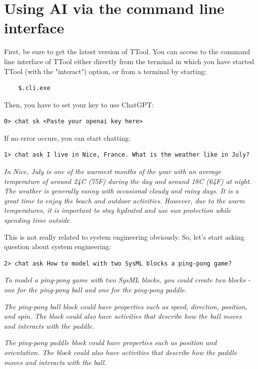 \documentclass[12pt]{article}
\begin{document}
\newpage
\section{Using AI via the command line interface}

First, be sure to get the latest version of TTool. You can access to the command line interface of TTool either directly from the terminal in which you have started TTool (with the "interact") option, or from a terminal by starting:

\begin{lstlisting}
    $.cli.exe    
\end{lstlisting}

Then, you have to set your key to use ChatGPT:
\begin{lstlisting}
0> chat sk <Paste your openai key here>
\end{lstlisting}

If no error occurs, you can start chatting:
\begin{lstlisting}
1> chat ask I live in Nice, France. What is the weather like in July?   
\end{lstlisting}              
\textit{In Nice, July is one of the warmest months of the year with an average temperature of around 24C (75F) during the day and around 18C (64F) at night. The weather is generally sunny with occasional cloudy and rainy days. It is a great time to enjoy the beach and outdoor activities. However, due to the warm temperatures, it is important to stay hydrated and use sun protection while spending time outside.}


This is not really related to system engineering obviously. So, let's start asking question about system engineering:
\begin{lstlisting}
2> chat ask How to model with two SysML blocks a ping-pong game?
\end{lstlisting}
    \textit{To model a ping-pong game with two SysML blocks, you could create two blocks - one for the ping-pong ball and one for the ping-pong paddle.}
    
    \textit{The ping-pong ball block could have properties such as speed, direction, position, and spin. The block could also have activities that describe how the ball moves and interacts with the paddle.}
    
    \textit{The ping-pong paddle block could have properties such as position and orientation. The block could also have activities that describe how the paddle moves and interacts with the ball.}
    
\end{document}
